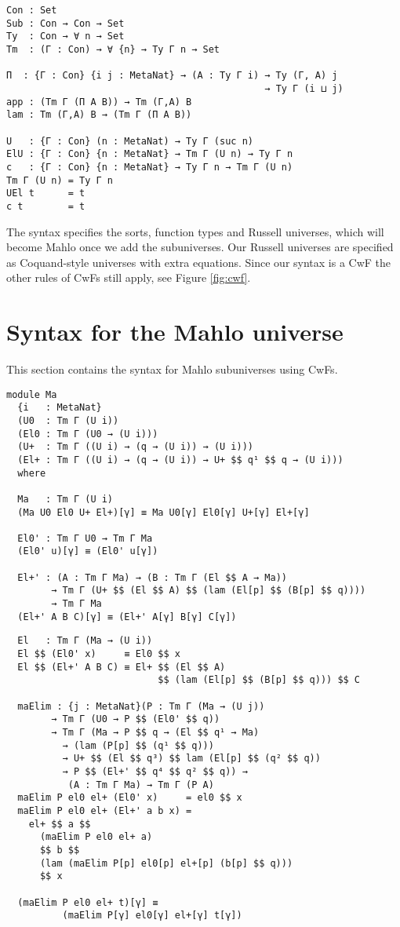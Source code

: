 \begin{verbatim}
Con : Set
Sub : Con → Con → Set
Ty  : Con → ∀ n → Set
Tm  : (Γ : Con) → ∀ {n} → Ty Γ n → Set

Π  : {Γ : Con} {i j : MetaNat} → (A : Ty Γ i) → Ty (Γ, A) j
                                              → Ty Γ (i ⊔ j)
app : (Tm Γ (Π A B)) → Tm (Γ,A) B
lam : Tm (Γ,A) B → (Tm Γ (Π A B))

U   : {Γ : Con} (n : MetaNat) → Ty Γ (suc n)
ElU : {Γ : Con} {n : MetaNat} → Tm Γ (U n) → Ty Γ n
c   : {Γ : Con} {n : MetaNat} → Ty Γ n → Tm Γ (U n)
Tm Γ (U n) = Ty Γ n
UEl t      = t
c t        = t
\end{verbatim}

The syntax specifies the sorts, function types and Russell universes, which will become Mahlo once we add the subuniverses. Our Russell universes are specified as Coquand-style universes with extra equations. Since our syntax is a CwF the other rules of CwFs still apply, see Figure \ref{fig:cwf}.

\section{Syntax for the Mahlo universe}

This section contains the syntax for Mahlo subuniverses using CwFs.

\begin{verbatim}
module Ma
  {i   : MetaNat}
  (U0  : Tm Γ (U i))
  (El0 : Tm Γ (U0 → (U i)))
  (U+  : Tm Γ ((U i) → (q → (U i)) → (U i)))
  (El+ : Tm Γ ((U i) → (q → (U i)) → U+ $$ q¹ $$ q → (U i)))
  where

  Ma   : Tm Γ (U i)
  (Ma U0 El0 U+ El+)[γ] ≡ Ma U0[γ] El0[γ] U+[γ] El+[γ]

  El0' : Tm Γ U0 → Tm Γ Ma
  (El0' u)[γ] ≡ (El0' u[γ])

  El+' : (A : Tm Γ Ma) → (B : Tm Γ (El $$ A → Ma))
        → Tm Γ (U+ $$ (El $$ A) $$ (lam (El[p] $$ (B[p] $$ q))))
        → Tm Γ Ma
  (El+' A B C)[γ] ≡ (El+' A[γ] B[γ] C[γ])
\end{verbatim}
\newpage
\begin{verbatim}
  El   : Tm Γ (Ma → (U i))
  El $$ (El0' x)     ≡ El0 $$ x
  El $$ (El+' A B C) ≡ El+ $$ (El $$ A)
                           $$ (lam (El[p] $$ (B[p] $$ q))) $$ C

  maElim : {j : MetaNat}(P : Tm Γ (Ma → (U j))
        → Tm Γ (U0 → P $$ (El0' $$ q))
        → Tm Γ (Ma → P $$ q → (El $$ q¹ → Ma)
          → (lam (P[p] $$ (q¹ $$ q)))
          → U+ $$ (El $$ q³) $$ lam (El[p] $$ (q² $$ q))
          → P $$ (El+' $$ q⁴ $$ q² $$ q)) →
           (A : Tm Γ Ma) → Tm Γ (P A)
  maElim P el0 el+ (El0' x)     = el0 $$ x
  maElim P el0 el+ (El+' a b x) =
    el+ $$ a $$
      (maElim P el0 el+ a)
      $$ b $$
      (lam (maElim P[p] el0[p] el+[p] (b[p] $$ q)))
      $$ x

  (maElim P el0 el+ t)[γ] ≡
          (maElim P[γ] el0[γ] el+[γ] t[γ])
\end{verbatim}

